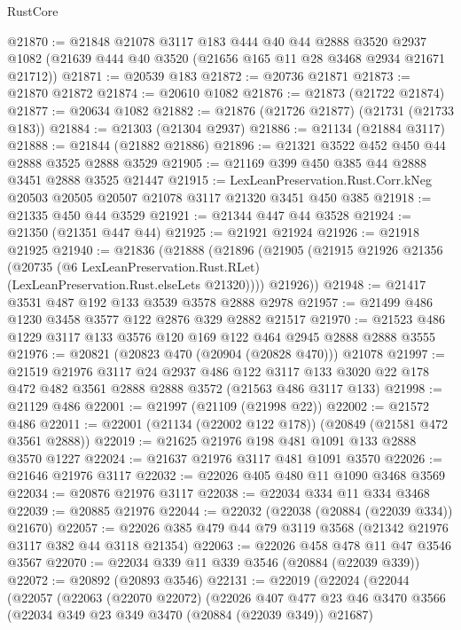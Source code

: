 \begin{lexlean}{RustCore}
\begin{coremodule}
@21870 := @21848
    @21078
    @3117
    @183
    @444
    @40
    @44
    @2888
    @3520
    @2937
    @1082
    (@21639 @444 @40 @3520 (@21656 @165 @11 @28 @3468 @2934 @21671 @21712))
@21871 := @20539 @183
@21872 := @20736 @21871
@21873 := @21870 @21872
@21874 := @20610 @1082
@21876 := @21873 (@21722 @21874)
@21877 := @20634 @1082
@21882 := @21876 (@21726 @21877) (@21731 (@21733 @183))
@21884 := @21303 (@21304 @2937)
@21886 := @21134 (@21884 @3117)
@21888 := @21844 (@21882 @21886)
@21896 := @21321 @3522 @452 @450 @44 @2888 @3525 @2888 @3529
@21905 := @21169 @399 @450 @385 @44 @2888 @3451 @2888 @3525 @21447
@21915 := LexLeanPreservation.Rust.Corr.kNeg
    @20503
    @20505
    @20507
    @21078
    @3117
    @21320
    @3451
    @450
    @385
@21918 := @21335 @450 @44 @3529
@21921 := @21344 @447 @44 @3528
@21924 := @21350 (@21351 @447 @44)
@21925 := @21921 @21924
@21926 := @21918 @21925
@21940 := @21836
    (@21888
      (@21896
        (@21905
          (@21915
            @21926
            @21356
            (@20735 (@6 LexLeanPreservation.Rust.RLet) (LexLeanPreservation.Rust.elseLets @21320))))
        @21926))
@21948 := @21417 @3531 @487 @192 @133 @3539 @3578 @2888 @2978
@21957 := @21499 @486 @1230 @3458 @3577 @122 @2876 @329 @2882 @21517
@21970 := @21523 @486 @1229 @3117 @133 @3576 @120 @169 @122 @464 @2945 @2888 @2888 @3555
@21976 := @20821 (@20823 @470 (@20904 (@20828 @470))) @21078
@21997 := @21519
    @21976
    @3117
    @24
    @2937
    @486
    @122
    @3117
    @133
    @3020
    @22
    @178
    @472
    @482
    @3561
    @2888
    @2888
    @3572
    (@21563 @486 @3117 @133)
@21998 := @21129 @486
@22001 := @21997 (@21109 (@21998 @22))
@22002 := @21572 @486
@22011 := @22001 (@21134 (@22002 @122 @178)) (@20849 (@21581 @472 @3561 @2888))
@22019 := @21625 @21976 @198 @481 @1091 @133 @2888 @3570 @1227
@22024 := @21637 @21976 @3117 @481 @1091 @3570
@22026 := @21646 @21976 @3117
@22032 := @22026 @405 @480 @11 @1090 @3468 @3569
@22034 := @20876 @21976 @3117
@22038 := @22034 @334 @11 @334 @3468
@22039 := @20885 @21976
@22044 := @22032 (@22038 (@20884 (@22039 @334)) @21670)
@22057 := @22026 @385 @479 @44 @79 @3119 @3568 (@21342 @21976 @3117 @382 @44 @3118 @21354)
@22063 := @22026 @458 @478 @11 @47 @3546 @3567
@22070 := @22034 @339 @11 @339 @3546 (@20884 (@22039 @339))
@22072 := @20892 (@20893 @3546)
@22131 := @22019
    (@22024
      (@22044
        (@22057
          (@22063
            (@22070 @22072)
            (@22026
              @407
              @477
              @23
              @46
              @3470
              @3566
              (@22034 @349 @23 @349 @3470 (@20884 (@22039 @349)) @21687)

\end{coremodule}
\end{lexlean}
